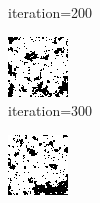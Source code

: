 \documentclass{article}
\begin{document}
\begin{figure}[h]
\begin{subfigure}[t]{0.18\textwidth}
\vspace{-0.6cm}
\caption{iteration=200}
\end{subfigure}\hspace{0.01\textwidth}
\begin{subfigure}[t]{0.18\textwidth}
\centering
\includegraphics[width=\textwidth]{./computational/results/gibbs_node_sampler_positive_iter_300.png}
\vspace{-0.6cm}
\caption{iteration=300}
\end{subfigure}\hspace{0.01\textwidth}
\begin{subfigure}[t]{0.18\textwidth}
\centering
\includegraphics[width=\textwidth]{./computational/results/gibbs_node_sampler_positive_iter_400.png}

\end{subfigure}
\end{figure}
\end{document}

